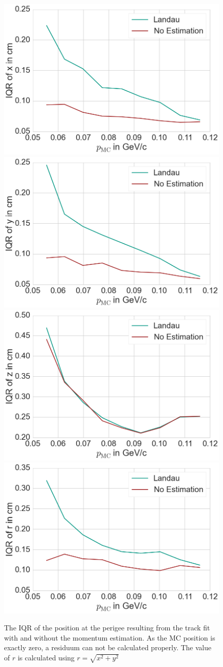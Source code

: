 \begin{figure}
  \centering
  \includegraphics[width=0.48\linewidth]{figures/vxd/perigee_x.png}
  \includegraphics[width=0.48\linewidth]{figures/vxd/perigee_y.png}
  \includegraphics[width=0.48\linewidth]{figures/vxd/perigee_z.png}
  \includegraphics[width=0.48\linewidth]{figures/vxd/perigee_r.png}
  \caption[Perigee position with and without the momentum estimation.]{The IQR of the position at the perigee resulting from the track fit with and without the momentum estimation. As the MC position is exactly zero, a residuum can not be calculated properly. The value of $r$ is calculated using $r=\sqrt{x^2 + y^2}$}
  \label{fig-position}
\end{figure}

